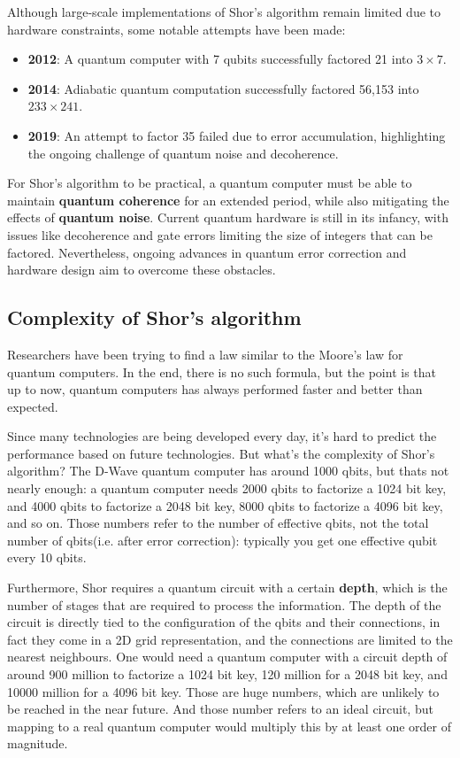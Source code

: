 Although large-scale implementations of Shor's algorithm remain
limited due to hardware constraints, some notable attempts have been
made:  
\begin{itemize}
  \item \textbf{2012}: A quantum computer with 7 qubits successfully
    factored 21 into \(3 \times 7\).  
  \item \textbf{2014}: Adiabatic quantum computation successfully
    factored 56,153 into \(233 \times 241\).  
  \item \textbf{2019}: An attempt to factor 35 failed due to error
    accumulation, highlighting the ongoing challenge of quantum
    noise and decoherence.  
\end{itemize}

For Shor's algorithm to be practical, a quantum computer must be able
to maintain \textbf{quantum coherence} for an extended period, while
also mitigating the effects of \textbf{quantum noise}. Current quantum
hardware is still in its infancy, with issues like decoherence and
gate errors limiting the size of integers that can be factored.
Nevertheless, ongoing advances in quantum error correction and
hardware design aim to overcome these obstacles.

\subsection{Complexity of Shor's algorithm}
Researchers have been trying to find a law similar to the Moore's law
for quantum computers. In the end, there is no such formula, but the
point is that up to now, quantum computers has always performed faster
and better than expected.

Since many technologies are being developed every day, it's hard to
predict the performance based on future technologies. But what's the
complexity of Shor's algorithm? The D-Wave quantum computer has around
1000 qbits, but thats not nearly enough: a quantum computer needs 2000
qbits to factorize a 1024 bit key, and 4000 qbits to factorize a 2048
bit key, 8000 qbits to factorize a 4096 bit key, and so on. Those
numbers refer to the number of effective qbits, not the total number 
of qbits(i.e. after error correction): typically you get one effective
qubit every 10 qbits.

Furthermore, Shor requires a quantum circuit with a certain
\textbf{depth}, which is the number of stages that are required to
process the information. The depth of the circuit is directly tied to
the configuration of the qbits and their connections, in fact they
come in a 2D grid representation, and the connections are limited to
the nearest neighbours. One would need a quantum computer with a 
circuit depth of around 900 million to factorize a 1024 bit key, 120
million for a 2048 bit key, and 10000 million for a 4096 bit key.
Those are huge numbers, which are unlikely to be reached in the near 
future. And those number refers to an ideal circuit, but mapping to a
real quantum computer would multiply this by at least one order of
magnitude.

